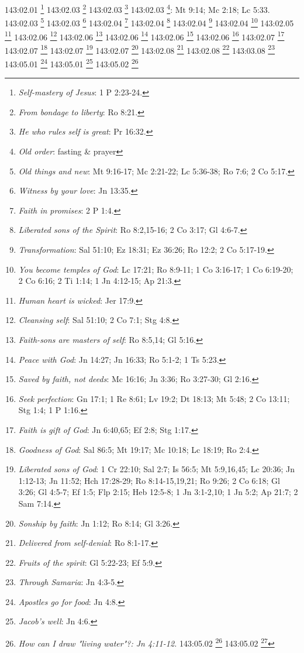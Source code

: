 {{{{{{{{{{{{{{{{{{{{{{{{{{{143:02.01 \footnote{\textit{Self-mastery of Jesus}: 1 P 2:23-24.}
143:02.03 \footnote{\textit{From bondage to liberty}: Ro 8:21.}
143:02.03 \footnote{\textit{He who rules self is great}: Pr 16:32.}
143:02.03 \footnote{\textit{Old order}: fasting & prayer}: Mt 9:14; Mc 2:18; Lc 5:33.}
143:02.03 \footnote{\textit{Old things and new}: Mt 9:16-17; Mc 2:21-22; Lc 5:36-38; Ro 7:6; 2 Co 5:17.}
143:02.03 \footnote{\textit{Witness by your love}: Jn 13:35.}
143:02.04 \footnote{\textit{Faith in promises}: 2 P 1:4.}
143:02.04 \footnote{\textit{Liberated sons of the Spirit}: Ro 8:2,15-16; 2 Co 3:17; Gl 4:6-7.}
143:02.04 \footnote{\textit{Transformation}: Sal 51:10; Ez 18:31; Ez 36:26; Ro 12:2; 2 Co 5:17-19.}
143:02.04 \footnote{\textit{You become temples of God}: Lc 17:21; Ro 8:9-11; 1 Co 3:16-17; 1 Co 6:19-20; 2 Co 6:16; 2 Ti 1:14; 1 Jn 4:12-15; Ap 21:3.}
143:02.05 \footnote{\textit{Human heart is wicked}: Jer 17:9.}
143:02.06 \footnote{\textit{Cleansing self}: Sal 51:10; 2 Co 7:1; Stg 4:8.}
143:02.06 \footnote{\textit{Faith-sons are masters of self}: Ro 8:5,14; Gl 5:16.}
143:02.06 \footnote{\textit{Peace with God}: Jn 14:27; Jn 16:33; Ro 5:1-2; 1 Ts 5:23.}
143:02.06 \footnote{\textit{Saved by faith, not deeds}: Mc 16:16; Jn 3:36; Ro 3:27-30; Gl 2:16.}
143:02.06 \footnote{\textit{Seek perfection}: Gn 17:1; 1 Re 8:61; Lv 19:2; Dt 18:13; Mt 5:48; 2 Co 13:11; Stg 1:4; 1 P 1:16.}
143:02.07 \footnote{\textit{Faith is gift of God}: Jn 6:40,65; Ef 2:8; Stg 1:17.}
143:02.07 \footnote{\textit{Goodness of God}: Sal 86:5; Mt 19:17; Mc 10:18; Lc 18:19; Ro 2:4.}
143:02.07 \footnote{\textit{Liberated sons of God}: 1 Cr 22:10; Sal 2:7; Is 56:5; Mt 5:9,16,45; Lc 20:36; Jn 1:12-13; Jn 11:52; Hch 17:28-29; Ro 8:14-15,19,21; Ro 9:26; 2 Co 6:18; Gl 3:26; Gl 4:5-7; Ef 1:5; Flp 2:15; Heb 12:5-8; 1 Jn 3:1-2,10; 1 Jn 5:2; Ap 21:7; 2 Sam 7:14.}
143:02.07 \footnote{\textit{Sonship by faith}: Jn 1:12; Ro 8:14; Gl 3:26.}
143:02.08 \footnote{\textit{Delivered from self-denial}: Ro 8:1-17.}
143:02.08 \footnote{\textit{Fruits of the spirit}: Gl 5:22-23; Ef 5:9.}
143:03.08 \footnote{\textit{Through Samaria}: Jn 4:3-5.}
143:05.01 \footnote{\textit{Apostles go for food}: Jn 4:8.}
143:05.01 \footnote{\textit{Jacob's well}: Jn 4:6.}
143:05.02 \footnote{\textit{How can I draw "living water"?: Jn 4:11-12.}
143:05.02 \footnote{\textit{Jesus asks woman for water}: Jn 4:7.}
143:05.02 \footnote{\textit{Jesus tells of "living water": Jn 4:10.}
143:05.02 \footnote{\textit{Nalda's reply}: Jn 4:9.}
143:05.03 \footnote{\textit{Conversation with Nalda}: Jn 4:13-15.}
143:05.04 \footnote{\textit{Further conversation}: Jn 4:16-18.}
}}}}}}}}}}}}}}}}}}}}}}}}}}}}
